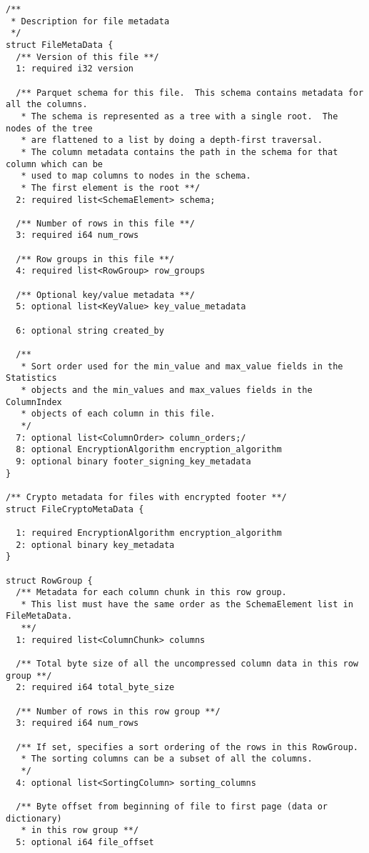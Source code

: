 \documentclass[manuscript]{acmart}
\begin{document}
\begin{verbatim}
/**
 * Description for file metadata
 */
struct FileMetaData {
  /** Version of this file **/
  1: required i32 version

  /** Parquet schema for this file.  This schema contains metadata for all the columns.
   * The schema is represented as a tree with a single root.  The nodes of the tree
   * are flattened to a list by doing a depth-first traversal.
   * The column metadata contains the path in the schema for that column which can be
   * used to map columns to nodes in the schema.
   * The first element is the root **/
  2: required list<SchemaElement> schema;

  /** Number of rows in this file **/
  3: required i64 num_rows

  /** Row groups in this file **/
  4: required list<RowGroup> row_groups

  /** Optional key/value metadata **/
  5: optional list<KeyValue> key_value_metadata

  6: optional string created_by

  /**
   * Sort order used for the min_value and max_value fields in the Statistics
   * objects and the min_values and max_values fields in the ColumnIndex
   * objects of each column in this file.
   */
  7: optional list<ColumnOrder> column_orders;/
  8: optional EncryptionAlgorithm encryption_algorithm
  9: optional binary footer_signing_key_metadata
}

/** Crypto metadata for files with encrypted footer **/
struct FileCryptoMetaData {

  1: required EncryptionAlgorithm encryption_algorithm
  2: optional binary key_metadata
}

struct RowGroup {
  /** Metadata for each column chunk in this row group.
   * This list must have the same order as the SchemaElement list in FileMetaData.
   **/
  1: required list<ColumnChunk> columns

  /** Total byte size of all the uncompressed column data in this row group **/
  2: required i64 total_byte_size

  /** Number of rows in this row group **/
  3: required i64 num_rows

  /** If set, specifies a sort ordering of the rows in this RowGroup.
   * The sorting columns can be a subset of all the columns.
   */
  4: optional list<SortingColumn> sorting_columns

  /** Byte offset from beginning of file to first page (data or dictionary)
   * in this row group **/
  5: optional i64 file_offset


\end{verbatim}
\end{document}
